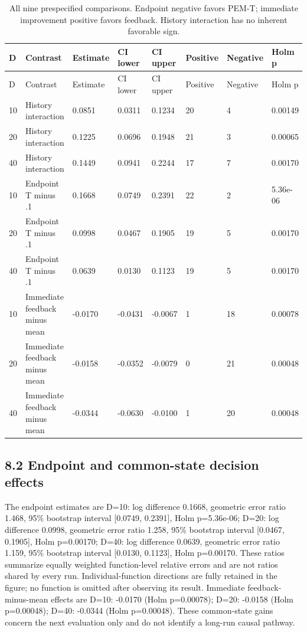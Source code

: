 \documentclass[11pt,a4paper]{article}
\begin{document}
\par\noindent\begin{minipage}{\linewidth}

\begin{longtable}[]{@{}llllllll@{}}
\caption{All nine prespecified comparisons. Endpoint negative favors
PEM-T; immediate improvement positive favors feedback. History
interaction has no inherent favorable sign.}\tabularnewline
\toprule
D & Contrast & Estimate & CI lower & CI upper & Positive & Negative &
Holm p \\
\midrule
\endfirsthead
\toprule
D & Contrast & Estimate & CI lower & CI upper & Positive & Negative &
Holm p \\
\midrule
\endhead
10 & History interaction & 0.0851 & 0.0311 & 0.1234 & 20 & 4 &
0.00149 \\
20 & History interaction & 0.1225 & 0.0696 & 0.1948 & 21 & 3 &
0.00065 \\
40 & History interaction & 0.1449 & 0.0941 & 0.2244 & 17 & 7 &
0.00170 \\
10 & Endpoint T minus .1 & 0.1668 & 0.0749 & 0.2391 & 22 & 2 &
5.36e-06 \\
20 & Endpoint T minus .1 & 0.0998 & 0.0467 & 0.1905 & 19 & 5 &
0.00170 \\
40 & Endpoint T minus .1 & 0.0639 & 0.0130 & 0.1123 & 19 & 5 &
0.00170 \\
10 & Immediate feedback minus mean & -0.0170 & -0.0431 & -0.0067 & 1 &
18 & 0.00078 \\
20 & Immediate feedback minus mean & -0.0158 & -0.0352 & -0.0079 & 0 &
21 & 0.00048 \\
40 & Immediate feedback minus mean & -0.0344 & -0.0630 & -0.0100 & 1 &
20 & 0.00048 \\
\bottomrule
\end{longtable}

\end{minipage}\par

\hypertarget{endpoint-and-common-state-decision-effects}{%
\subsection{8.2 Endpoint and common-state decision
effects}\label{endpoint-and-common-state-decision-effects}}

The endpoint estimates are D=10: log difference 0.1668, geometric error
ratio 1.468, 95\% bootstrap interval {[}0.0749, 0.2391{]}, Holm
p=5.36e-06; D=20: log difference 0.0998, geometric error ratio 1.258,
95\% bootstrap interval {[}0.0467, 0.1905{]}, Holm p=0.00170; D=40: log
difference 0.0639, geometric error ratio 1.159, 95\% bootstrap interval
{[}0.0130, 0.1123{]}, Holm p=0.00170. These ratios summarize equally
weighted function-level relative errors and are not ratios shared by
every run. Individual-function directions are fully retained in the
figure; no function is omitted after observing its result. Immediate
feedback-minus-mean effects are D=10: -0.0170 (Holm p=0.00078); D=20:
-0.0158 (Holm p=0.00048); D=40: -0.0344 (Holm p=0.00048). These
common-state gains concern the next evaluation only and do not identify
a long-run causal pathway.
\end{document}
